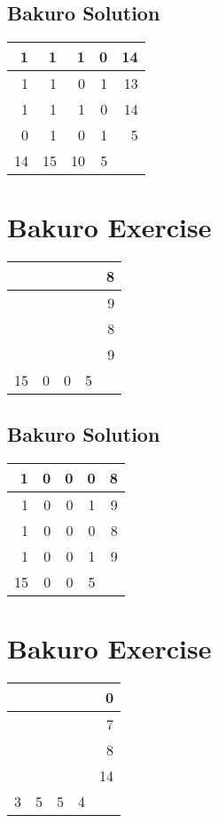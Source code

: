 \documentclass[]{article}
\begin{document}
 \subsection{Bakuro Solution} 
\begin{tabular}{rrrrr}
\hline
  1 &  1 &  1 & 0 & 14 \\ \hline
  1 &  1 &  0 & 1 & 13 \\ \hline
  1 &  1 &  1 & 0 & 14 \\ \hline
  0 &  1 &  0 & 1 &  5 \\ \hline
 14 & 15 & 10 & 5 &    \\ \hline
\hline
\end{tabular}\newpage\section{Bakuro Exercise}\begin{tabular}{rrrrr}
\hline
    &   &   &   & 8 \\ \hline
    &   &   &   & 9 \\ \hline
    &   &   &   & 8 \\ \hline
    &   &   &   & 9 \\ \hline
 15 & 0 & 0 & 5 &   \\ \hline
\hline
\end{tabular}\newpage 
 \subsection{Bakuro Solution} 
\begin{tabular}{rrrrr}
\hline
  1 & 0 & 0 & 0 & 8 \\ \hline
  1 & 0 & 0 & 1 & 9 \\ \hline
  1 & 0 & 0 & 0 & 8 \\ \hline
  1 & 0 & 0 & 1 & 9 \\ \hline
 15 & 0 & 0 & 5 &   \\ \hline
\hline
\end{tabular}\newpage\section{Bakuro Exercise}\begin{tabular}{rrrrr}
\hline
   &   &   &   &  0 \\ \hline
   &   &   &   &  7 \\ \hline
   &   &   &   &  8 \\ \hline
   &   &   &   & 14 \\ \hline
 3 & 5 & 5 & 4 &    \\ \hline
\hline
\end{tabular}\newpage 
\end{document}
